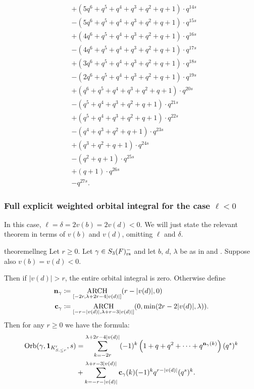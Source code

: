 \begin{example}
\begin{align*}
    &+ (5q^6 + q^5 + q^4 + q^3 + q^2 + q + 1) \cdot q^{14s} \\
    &- (5q^6 + q^5 + q^4 + q^3 + q^2 + q + 1) \cdot q^{15s} \\
    &+ (4q^6 + q^5 + q^4 + q^3 + q^2 + q + 1) \cdot q^{16s} \\
    &- (4q^6 + q^5 + q^4 + q^3 + q^2 + q + 1) \cdot q^{17s} \\
    &+ (3q^6 + q^5 + q^4 + q^3 + q^2 + q + 1) \cdot q^{18s} \\
    &- (2q^6 + q^5 + q^4 + q^3 + q^2 + q + 1) \cdot q^{19s} \\
    &+ (q^6 + q^5 + q^4 + q^3 + q^2 + q + 1) \cdot q^{20s} \\
    &- (q^5 + q^4 + q^3 + q^2 + q + 1) \cdot q^{21s} \\
    &+ (q^5 + q^4 + q^3 + q^2 + q + 1) \cdot q^{22s} \\
    &- (q^4 + q^3 + q^2 + q + 1) \cdot q^{23s} \\
    &+ (q^3 + q^2 + q + 1) \cdot q^{24s} \\
    &- (q^2 + q + 1) \cdot q^{25s} \\
    &+ (q + 1) \cdot q^{26s} \\
    &- q^{27s}.
  \end{align*}
\end{example}


\subsubsection{Full explicit weighted orbital integral for the case $\ell < 0$}
In this case, $\ell = \delta = 2v(b) = 2v(d) < 0$.
We will just state the relevant theorem in terms of $v(b)$ and $v(d)$, omitting $\ell$ and $\delta$.
\begin{restatable}[Weighted orbital integral when $v(b)=v(d)<0$]{theorem}{ellneg}
  \label{thm:full_orbital_ell_neg}
  Let $r \ge 0$.
  Let $\gamma \in S_3(F)_{\mathrm{rs}}^-$ and let $b$, $d$, $\lambda$ be as in
   and .
  Suppose also $v(b) = v(d) < 0$.

  Then if $|v(d)| > r$, the entire orbital integral is zero.
  Otherwise define
  \begin{align*}
    \mathbf n_\gamma &\coloneqq \operatorname*{ARCH}_{[-2r, \lambda+2r-4|v(d)|]}(r-|v(d)|, 0) \\
    \mathbf c_\gamma &\coloneqq \operatorname*{ARCH}_{[-r-|v(d)|, \lambda+r-3|v(d)|]} (0, \min(2r-2|v(d)|, \lambda)).
  \end{align*}
  Then for any $r \ge 0$ we have the formula:
  \begin{align*}
    \operatorname{Orb}(\gamma, \mathbf{1}_{K'_{S, \le r}}, s)
    &= \sum_{k = -2r}^{\lambda + 2r-4|v(d)|}
    (-1)^k \left( 1 + q + q^2 + \dots + q^{\mathbf n_{\gamma}(k)} \right) (q^s)^k \\
    &+ \sum_{k = -r-|v(d)|}^{\lambda+r-3|v(d)|} \mathbf c_\gamma(k) (-1)^k q^{r-|v(d)|} (q^s)^k.
  \end{align*}
\end{restatable}

